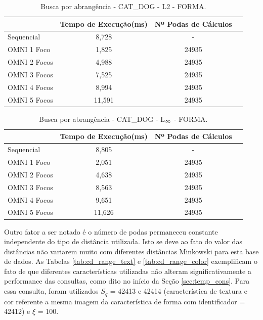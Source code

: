 \begin{table}[H]
    \centering
    \caption[Busca por abrangência - CAT\_DOG - L2 - FORMA]{Busca por abrangência - CAT\_DOG - L2 - FORMA.
    \label{tab:cd_range_l2}}
   \begin{tabular}{l c c c}
        \toprule
            &Tempo de Execução(ms)&Nº Podas de Cálculos\\
        \midrule
            Sequencial & 8,728 & - \\
            OMNI 1 Foco & 1,825 & 24935 \\
            OMNI 2 Focos & 4,988 & 24935 \\
            OMNI 3 Focos & 7,525 & 24935 \\
            OMNI 4 Focos & 8,994 & 24935 \\
            OMNI 5 Focos & 11,591 & 24935 \\
        \bottomrule
    \end{tabular}
\end{table}

\begin{table}[H]
    \centering
    \caption[Busca por abrangência - CAT\_DOG - L$_\protect\infty$ - FORMA]{Busca por abrangência - CAT\_DOG - L$_\protect\infty$ - FORMA.
    \label{tab:cd_range_linf}}
   \begin{tabular}{l c c c}
        \toprule
            &Tempo de Execução(ms)&Nº Podas de Cálculos\\
        \midrule
            Sequencial & 8,805 & - \\
            OMNI 1 Foco & 2,051 & 24935 \\
            OMNI 2 Focos & 4,638 & 24935 \\
            OMNI 3 Focos & 8,563 & 24935 \\
            OMNI 4 Focos & 9,651 & 24935 \\
            OMNI 5 Focos & 11,626 & 24935 \\
        \bottomrule
    \end{tabular}
\end{table}

Outro fator a ser notado é o número de podas permaneceu constante independente do tipo de distância utilizada. Isto se deve ao fato
do valor das distâncias não variarem muito com diferentes distâncias Minkowski para esta base de dados. As Tabelas \ref{tab:cd_range_text} e \ref{tab:cd_range_color}
exemplificam o fato de que diferentes características utilizadas não alteram significativamente a performance
das consultas, como dito no início da Seção \ref{sec:temp_cons}. Para essa consulta, foram utilizados $S_q$ = 42413 e 42414 (característica de
textura e cor referente a mesma imagem da característica de forma com identificador = 42412) e $\xi$ = 100.

